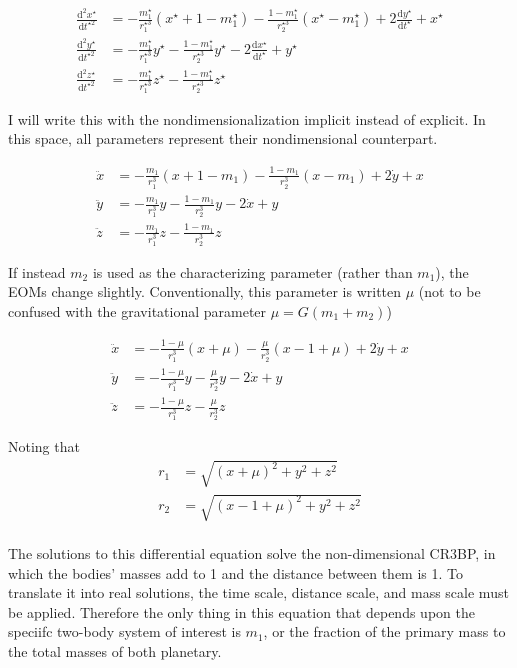 \documentclass{article}
\newcommand{\dd}[2]{\frac{\mathrm{d}#1}{\mathrm{d}#2}}
\begin{document}
\[\begin{aligned}
    \dd{^2x^\star}{t^{\star2}}&=-\frac{m_1^\star}{r_1^{\star3}}(x^\star+1-m_1^\star)-\frac{1-m_1^\star}{r_2^{\star3}}(x^\star-m_1^\star)+2\dd{y^\star}{t^\star}+x^\star\\
    \dd{^2y^\star}{t^{\star2}}&=-\frac{m_1^\star}{r_1^{\star3}}y^\star-\frac{1-m_1^\star}{r_2^{\star3}}y^\star-2\dd{x^\star}{t^\star}+y^\star\\
    \dd{^2z^\star}{t^{\star2}}&=-\frac{m_1^\star}{r_1^{\star3}}z^\star-\frac{1-m_1^\star}{r_2^{\star3}}z^\star
\end{aligned}\]

I will write this with the nondimensionalization implicit instead of explicit. In this space, all parameters represent their nondimensional counterpart.

\[\begin{aligned}
    \ddot{x}&=-\frac{m_1}{r_1^3}(x+1-m_1)-\frac{1-m_1}{r_2^3}(x-m_1)+2\dot{y}+x\\
    \ddot{y}&=-\frac{m_1}{r_1^3}y-\frac{1-m_1}{r_2^3}y-2\dot{x}+y\\
    \ddot{z}&=-\frac{m_1}{r_1^3}z-\frac{1-m_1}{r_2^3}z
\end{aligned}\]

If instead $m_2$ is used as the characterizing parameter (rather than $m_1$), the EOMs change slightly. Conventionally, this parameter is written $\mu$ (not to be confused with the gravitational parameter $\mu=G(m_1+m_2)$)

\[\boxed{\begin{aligned}
    \ddot{x}&=-\frac{1-\mu}{r_1^3}(x+\mu)-\frac{\mu}{r_2^3}(x-1+\mu)+2\dot{y}+x\\
    \ddot{y}&=-\frac{1-\mu}{r_1^3}y-\frac{\mu}{r_2^3}y-2\dot{x}+y\\
    \ddot{z}&=-\frac{1-\mu}{r_1^3}z-\frac{\mu}{r_2^3}z
\end{aligned}}\]

Noting that
\[\boxed{\begin{aligned}
    r_1&=\sqrt{(x+\mu)^2+y^2+z^2}\\
    r_2&=\sqrt{(x-1+\mu)^2+y^2+z^2}\\
\end{aligned}}\]

The solutions to this differential equation solve the non-dimensional CR3BP, in which the bodies' masses add to 1 and the distance between them is 1. To translate it into real solutions, the time scale, distance scale, and mass scale must be applied. Therefore the only thing in this equation that depends upon the speciifc two-body system of interest is $m_1$, or the fraction of the primary mass to the total masses of both planetary.
\end{document}
